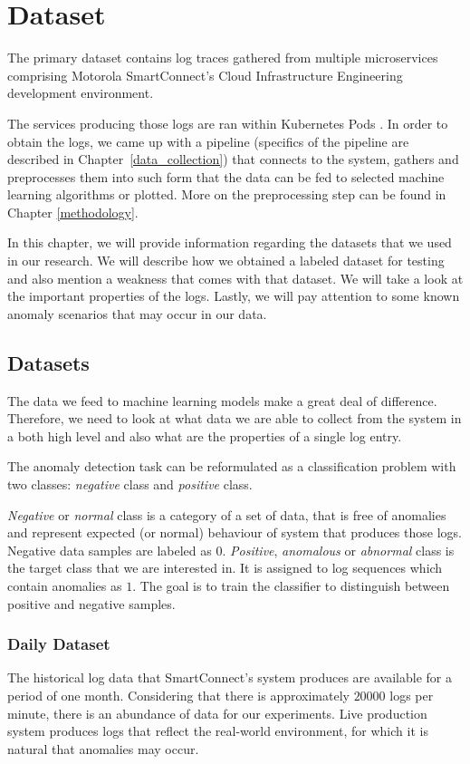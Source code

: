 \chapter{Dataset}

The primary dataset contains log traces gathered from multiple microservices comprising Motorola SmartConnect's Cloud Infrastructure Engineering development environment.

The services producing those logs are ran within Kubernetes Pods \cite{K8s:pods}. 
In order to obtain the logs, we came up with a pipeline (specifics of the pipeline are described in Chapter~\ref{data_collection}) that connects to the system, gathers and preprocesses them into such form that the data can be fed to selected machine learning algorithms or plotted.
More on the preprocessing step can be found in Chapter \ref{methodology}.

In this chapter, we will provide information regarding the datasets that we used in our research. We will describe how we obtained a labeled dataset for testing and also mention a weakness that comes with that dataset. We will take a look at the important properties of the logs. Lastly, we will pay attention to some known anomaly scenarios that may occur in our data.  

\section{Datasets}
The data we feed to machine learning models make a great deal of difference. Therefore, we need to look at what data we are able to collect from the system in a both high level and also what are the properties of a single log entry.

The anomaly detection task can be reformulated as a classification problem with two classes: \textit{negative} class and \textit{positive} class. 

\textit{Negative} or \textit{normal} class is a category of a set of data, that is free of anomalies and represent expected (or normal) behaviour of system that produces those logs. Negative data samples are labeled as $0$. \textit{Positive}, \textit{anomalous} or \textit{abnormal} class is the target class that we are interested in. It is assigned to log sequences which contain anomalies as $1$. The goal is to train the classifier to distinguish between positive and negative samples.

\subsection{Daily Dataset} 
The historical log data that SmartConnect's system produces are available for a period of one month. Considering that there is approximately $20000$ logs per minute,  there is an abundance of data for our experiments. Live production system produces logs that reflect the real-world environment, for which it is natural that anomalies may occur. 


